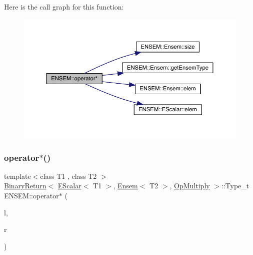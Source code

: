 Here is the call graph for this function\+:\nopagebreak
\begin{figure}[H]
\begin{center}
\leavevmode
\includegraphics[width=350pt]{d1/d9e/group__eensem_gad8e9dadde3e0114542b222f4631cc216_cgraph}
\end{center}
\end{figure}
\mbox{\label{group__eensem_ga56ee052eb9134728080172ffe2e946af}} 
\subsubsection{\texorpdfstring{operator$\ast$()}{operator*()}\hspace{0.1cm}{\footnotesize\ttfamily [3/11]}}
{\footnotesize\ttfamily template$<$class T1 , class T2 $>$ \\
\mbox{\hyperlink{structENSEM_1_1BinaryReturn}{Binary\+Return}}$<$ \mbox{\hyperlink{classENSEM_1_1EScalar}{E\+Scalar}}$<$ T1 $>$, \mbox{\hyperlink{classENSEM_1_1Ensem}{Ensem}}$<$ T2 $>$, \mbox{\hyperlink{structENSEM_1_1OpMultiply}{Op\+Multiply}} $>$\+::Type\+\_\+t E\+N\+S\+E\+M\+::operator$\ast$ (\begin{DoxyParamCaption}\item[{const \mbox{\hyperlink{classENSEM_1_1EScalar}{E\+Scalar}}$<$ T1 $>$ \&}]{l,  }\item[{const \mbox{\hyperlink{classENSEM_1_1Ensem}{Ensem}}$<$ T2 $>$ \&}]{r }\end{DoxyParamCaption})\hspace{0.3cm}{\ttfamily [inline]}}

